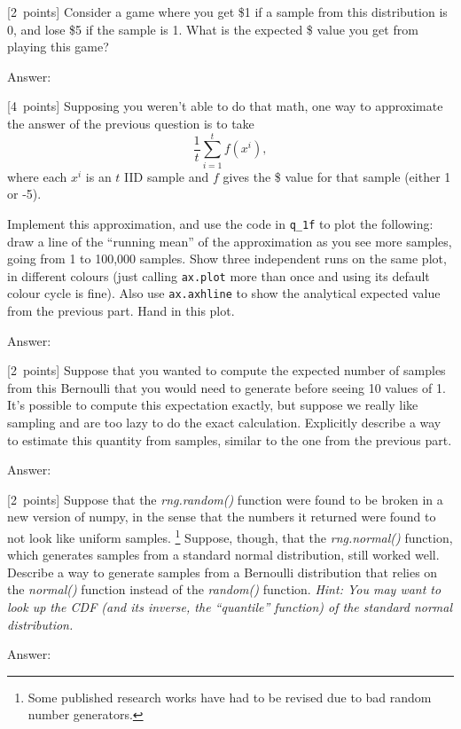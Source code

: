 \documentclass{article}
\newcommand{\ask}[1]{\textcolor{question}{#1}}
\newenvironment{answer}{\par\begingroup\color{answer}Answer: }{\endgroup}
\newcommand{\pts}[1]{\textcolor{points}{[#1~points]}}
\newcommand{\hint}[1]{\textcolor{black!60!white}{\emph{Hint: #1}}}
\newcommand{\TODO}{\color{red}{TODO}}
\begin{document}
\begin{qlist}
\item \pts{2}
    Consider a game where you get \$1 if a sample from this distribution is 0, and lose \$5 if the sample is 1.
    \ask{What is the expected \$ value you get from playing this game?}
\begin{answer}\TODO\end{answer}

\item \pts{4}
    Supposing you weren't able to do that math, one way to approximate the answer of the previous question is to take
    \[ \frac 1 t \sum_{i=1}^t f(x^i), \]
    where each $x^i$ is an $t$ IID sample and $f$ gives the \$ value for that sample (either 1 or -5).

    Implement this approximation, and use the code in \texttt{q\_1f} to plot the following:
    draw a line of the ``running mean'' of the approximation as you see more samples,
    going from 1 to 100,000 samples.
    Show three independent runs on the same plot, in different colours
    (just calling \texttt{ax.plot} more than once and using its default colour cycle is fine).
    Also use \texttt{ax.axhline} to show the analytical expected value from the previous part.
    \ask{Hand in this plot.}

\begin{answer}\TODO\end{answer}

\item \pts{2}
    Suppose that you wanted to compute the expected number of samples from this Bernoulli that you would need to generate before seeing 10 values of 1.
    It's possible to compute this expectation exactly,
    but suppose we really like sampling and are too lazy to do the exact calculation.
    \ask{Explicitly describe a way to estimate this quantity from samples, similar to the one from the previous part.}

\begin{answer}\TODO\end{answer}


\item \pts{2}
    Suppose that the \emph{rng.random()} function were found to be broken in a new version of numpy,
    in the sense that the numbers it returned were found to not look like uniform samples.%
    \footnote{Some published research works have had to be revised due to bad random number generators.}
    Suppose, though, that the \emph{rng.normal()} function, which generates samples from a standard normal distribution, still worked well.
    \ask{Describe a way to generate samples from a Bernoulli distribution that relies on the \emph{normal()} function instead of the \emph{random()} function.}
    \hint{You may want to look up the CDF (and its inverse, the ``quantile'' function) of the standard normal distribution.}

\begin{answer}\TODO\end{answer}
\end{qlist}
\end{document}
